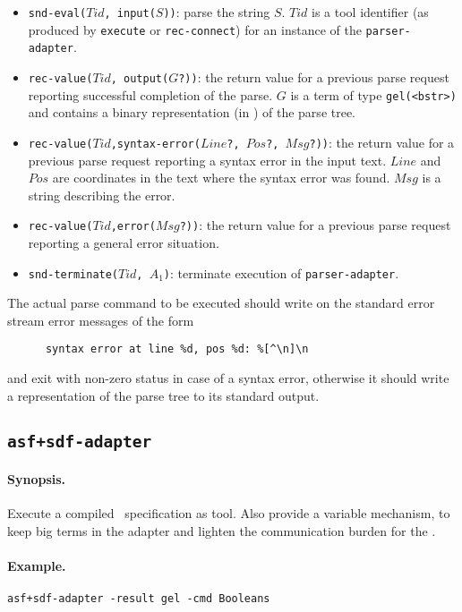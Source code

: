 \begin{itemize}
\item {\tt snd-eval($Tid$, input($S$))}: parse the string $S$.
$Tid$ is a tool identifier 
(as produced by {\tt execute} or {\tt rec-connect}) for an instance of the {\tt parser-adapter}.

\item {\tt rec-value($Tid$, output($G$?))}: the return value for a previous parse request
reporting successful completion of the parse.
$G$ is a term of type {\tt gel(<bstr>)} and contains a binary representation (in \GEL)
of the parse tree.

\item {\tt rec-value($Tid$,syntax-error($Line$?, $Pos$?, $Msg$?))}: the return value
for a previous parse request reporting a syntax error in the input text.
$Line$ and $Pos$ are coordinates in the text where the syntax error was found.
$Msg$ is a string describing the error.

\item {\tt rec-value($Tid$,error($Msg$?))}: the return value for a previous parse request
reporting a general error situation.

\item {\tt snd-terminate($Tid$, $A_1$)}: terminate execution of {\tt parser-adapter}.
\end{itemize}

\noindent The actual parse command to be executed should write on the standard error stream
error messages of the form
\begin{verbatim}
      syntax error at line %d, pos %d: %[^\n]\n
\end{verbatim}
and exit with non-zero status in case of a syntax error,
otherwise it should write a representation of the parse tree to its standard output.

\subsection{\label{asf+sdf-adapter}{\tt asf+sdf-adapter}}

\paragraph{Synopsis.} Execute a compiled \ASFSDF\ specification as tool.
Also provide a variable mechanism, to keep big terms in the adapter and
lighten the communication burden for the \TB.

\paragraph{Example.} {\tt asf+sdf-adapter -result gel -cmd Booleans}

